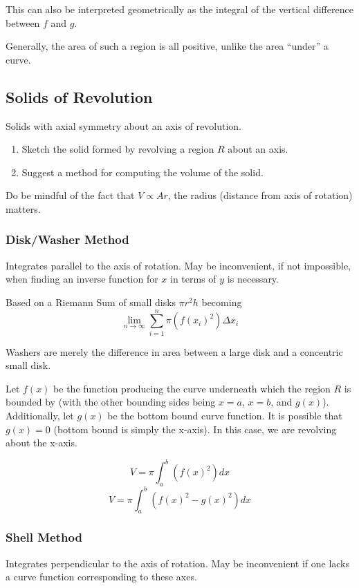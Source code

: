 \documentclass{article}
\begin{document}
This can also be interpreted geometrically as the integral of the vertical difference between $f$ and $g$.

Generally, the area of such a region is all positive, unlike the area ``under'' a curve.

\subsection{Solids of Revolution}
Solids with axial symmetry about an axis of revolution.

\begin{enumerate}
    \item Sketch the solid formed by revolving a region $R$ about an axis.
    \item Suggest a method for computing the volume of the solid.
\end{enumerate}

Do be mindful of the fact that $V \propto Ar$, the radius (distance from axis of rotation) matters.

\subsubsection{Disk/Washer Method}
Integrates parallel to the axis of rotation. May be inconvenient, if not impossible, when finding an inverse function for $x$ in terms of $y$ is necessary.

Based on a Riemann Sum of small disks $\pi r^2h$ becoming $$\lim_{n \to \infty} \sum_{i=1}^{n} \pi(f(x_i)^2)\Delta x_i$$

Washers are merely the difference in area between a large disk and a concentric small disk.

Let $f(x)$ be the function producing the curve underneath which the region $R$ is bounded by (with the other bounding sides being $x = a$, $x = b$, and $g(x)$). Additionally, let $g(x)$ be the bottom bound curve function. It is possible that $g(x) = 0$ (bottom bound is simply the x-axis). In this case, we are revolving about the x-axis.

$$V = \pi \int_{a}^{b} (f(x)^2) dx$$
$$V = \pi \int_{a}^{b} (f(x)^2 - g(x)^2) dx$$

\subsubsection{Shell Method}
Integrates perpendicular to the axis of rotation. May be inconvenient if one lacks a curve function corresponding to these axes.
\end{document}
